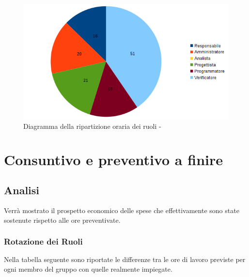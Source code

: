 \documentclass[12pt,a4paper]{article}
\begin{document}
\begin{center}
	\begin{figure}[H]
		\centering
		\includegraphics[width=\textwidth]{../img/diagrammaTortaVerificaValidazioneTotaleOre.png}
		\caption{Diagramma della ripartizione oraria dei ruoli - \FVV{}}
	\end{figure}
\end{center}

\newpage
\section{Consuntivo e preventivo a finire}

\subsection{Analisi}
Verrà mostrato il prospetto economico delle spese che effettivamente sono state sostenute rispetto alle ore preventivate.

\subsubsection{Rotazione dei Ruoli}
Nella tabella seguente sono riportate le differenze tra le ore di lavoro previste per ogni membro del gruppo con quelle realmente impiegate.
\end{document}
